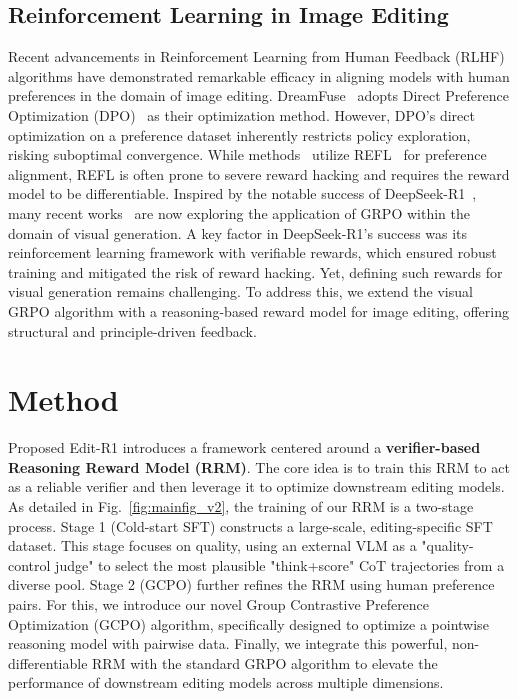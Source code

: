 \subsection{Reinforcement Learning in Image Editing}
Recent advancements in Reinforcement Learning from Human Feedback (RLHF) algorithms have demonstrated remarkable efficacy in aligning models with human preferences in the domain of image editing. 
DreamFuse~\citep{huang2025dreamfuse} adopts Direct Preference Optimization (DPO)~\citep{wallace2024diffusion} as their optimization method. 
However, DPO's direct optimization on a preference dataset inherently restricts policy exploration, risking suboptimal convergence.
While methods~\citep{gong2025onereward,ren2024byteedit} utilize REFL~\citep{xu2023imagereward} for preference alignment, REFL is often prone to severe reward hacking and requires the reward model to be differentiable.
Inspired by the notable success of DeepSeek-R1~\citep{guo2025deepseek}, many recent works~\citep{xue2025dancegrpo, liu2025flow} are now exploring the application of GRPO within the domain of visual generation. 
A key factor in DeepSeek-R1’s success was its reinforcement learning framework with verifiable rewards, which ensured robust training and mitigated the risk of reward hacking. Yet, defining such rewards for visual generation remains challenging. To address this, we extend the visual GRPO algorithm with a reasoning-based reward model for image editing, offering structural and principle-driven feedback.


\section{Method}

Proposed Edit-R1 introduces a framework centered around a \textbf{verifier-based Reasoning Reward Model (RRM)}. 
The core idea is to train this RRM to act as a reliable verifier and then leverage it to optimize downstream editing models. 
As detailed in Fig.~\ref{fig:mainfig_v2}, the training of our RRM is a two-stage process. 
Stage 1 (Cold-start SFT) constructs a large-scale, editing-specific SFT dataset. This stage focuses on quality, using an external VLM as a "quality-control judge" to select the most plausible "think+score" CoT trajectories from a diverse pool.
Stage 2 (GCPO) further refines the RRM using human preference pairs. For this, we introduce our novel Group Contrastive Preference Optimization (GCPO) algorithm, specifically designed to optimize a pointwise reasoning model with pairwise data. 
Finally, we integrate this powerful, non-differentiable RRM with the standard GRPO algorithm to elevate the performance of downstream editing models across multiple dimensions.



